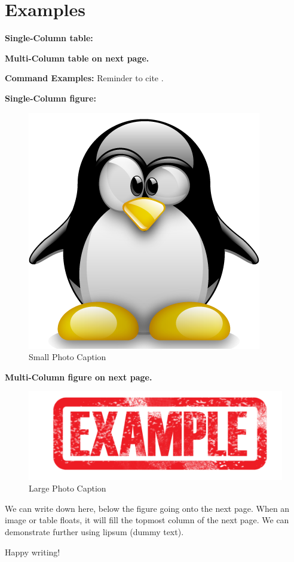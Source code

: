 \section{Examples}\label{sec:examples}

\textbf{Single-Column table:}
 \hfill \break 

\textbf{Multi-Column table on next page.}
 \hfill \break 

\textbf{Command Examples:} \hfill \break 
{} \hfill \break 
{} \hfill \break 
{} \hfill \break 
{} \hfill \break 
Reminder to cite \needcite. \hfill \break 

\textbf{Single-Column figure:} \hfill \break 
\begin{figure}[h]
  \centering
  \includegraphics[scale=0.2]{_graphics/smExample.png}
  \caption{Small Photo Caption\footnotemark}
  \label{fig:smPhoto}
\end{figure}



\textbf{Multi-Column figure on next page.} \hfill \break 
\begin{figure}[h]
  \centering
  \includegraphics[width=\textwidth]{_graphics/lgExample.png}
  \caption{Large Photo Caption}
  \label{fig:lgPhoto}
\end{figure}

We can write down here, below the figure going onto the next page. When an image or table floats, it will fill the topmost column of the next page. We can demonstrate further using lipsum (dummy text). \hfill \break
\lipsum[1-2] \hfill \break \break 

Happy writing!